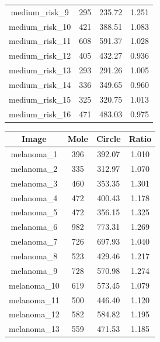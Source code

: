 \documentclass[12pt]{report}
\begin{document}
\begin{table}[ht]
\begin{minipage}[b]{0.5\linewidth}
\begin{tabular}{|c|c|c|c|}
medium\_risk\_9                       &295						&235.72			&1.251\\
medium\_risk\_10                      &421		                &388.51			&1.083\\
medium\_risk\_11                   	  &608		                &591.37			&1.028\\
medium\_risk\_12                      &405		                &432.27			&0.936\\
medium\_risk\_13                      &293		                &291.26			&1.005\\
medium\_risk\_14                      &336		                &349.65			&0.960\\
medium\_risk\_15                      &325		                &320.75			&1.013\\
medium\_risk\_16                      &471		                &483.03			&0.975\\
\hline
\end{tabular}
\end{minipage}
\hspace{0.6cm}
\begin{minipage}[b]{0.1\linewidth}
\centering
\begin{tabular}{|c|c|c|c|}
\hline
 \textbf{Image}  & \textbf{Mole} & \textbf{Circle} & \textbf{Ratio} \\
 \hline
melanoma\_1                         &396	 &392.07	 &1.010\\
melanoma\_2                         &335	 &312.97	 &1.070\\
melanoma\_3                         &460	 &353.35	 &1.301\\
melanoma\_4                         &472	 &400.43 &1.178\\
melanoma\_5                         &472	 &356.15	 &1.325\\
melanoma\_6                         &982	 &773.31	 &1.269\\
melanoma\_7                         &726	 &697.93	 &1.040\\
melanoma\_8                         &523	 &429.46	 &1.217\\
melanoma\_9                         &728	 &570.98	 &1.274\\
melanoma\_10                        &619	 &573.45	 &1.079\\
melanoma\_11                        &500	 &446.40	 &1.120\\
melanoma\_12                        &582	 &584.82	 &1.195\\
melanoma\_13                        &559	 &471.53	 &1.185\\

\end{tabular}
\end{minipage}
\end{table}
\end{document}
